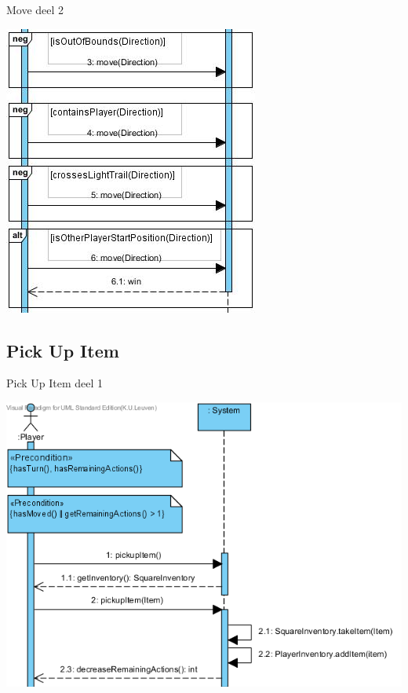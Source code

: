 \documentclass[t]{beamer}
\begin{document}
\begin{frame}{Move deel 2}
\begin{center}
\includegraphics[scale=0.7]{images/SSDMove2}
\end{center}
\end{frame}

\subsection{Pick Up Item}
\begin{frame}{Pick Up Item deel 1}
\begin{center}
\includegraphics[scale=0.55]{images/SSDPickUpItem1}
\end{center}
\end{frame}
\end{document}
